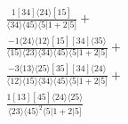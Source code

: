 \documentclass[varwidth, border=5pt]{standalone}
\begin{document}
\begin{my}
$\begin{gathered}
\scriptscriptstyle\frac{1[34]⟨24⟩[15]}{⟨34⟩⟨45⟩⟨5|1+2|5]}+\\
\scriptscriptstyle\frac{-1⟨24⟩⟨12⟩[15][34]⟨35⟩}{⟨15⟩⟨23⟩⟨34⟩⟨45⟩⟨5|1+2|5]}+\\
\scriptscriptstyle\frac{-3⟨13⟩⟨25⟩[35][34]⟨24⟩}{⟨12⟩⟨15⟩⟨34⟩⟨45⟩⟨5|1+2|5]}+\\
\scriptscriptstyle\frac{1[13][45]⟨24⟩⟨25⟩}{⟨23⟩⟨45⟩^2⟨5|1+2|5]}\phantom{+}
\end{gathered}$
\end{my}
\end{document}
